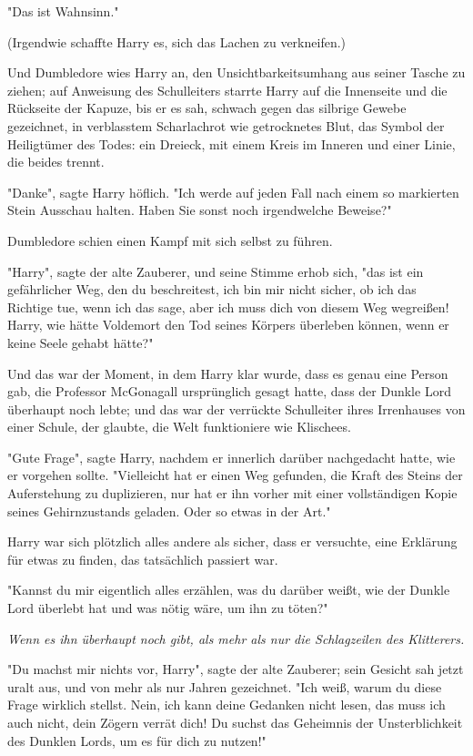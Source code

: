 {"Das ist Wahnsinn."

(Irgendwie schaffte Harry es, sich das Lachen zu verkneifen.)

Und Dumbledore wies Harry an, den Unsichtbarkeitsumhang aus seiner Tasche zu ziehen; auf Anweisung des Schulleiters starrte Harry auf die Innenseite und die Rückseite der Kapuze, bis er es sah, schwach gegen das silbrige Gewebe gezeichnet, in verblasstem Scharlachrot wie getrocknetes Blut, das Symbol der Heiligtümer des Todes: ein Dreieck, mit einem Kreis im Inneren und einer Linie, die beides trennt.

"Danke", sagte Harry höflich. "Ich werde auf jeden Fall nach einem so markierten Stein Ausschau halten. Haben Sie sonst noch irgendwelche Beweise?"

Dumbledore schien einen Kampf mit sich selbst zu führen.

"Harry", sagte der alte Zauberer, und seine Stimme erhob sich, "das ist ein gefährlicher Weg, den du beschreitest, ich bin mir nicht sicher, ob ich das Richtige tue, wenn ich das sage, aber ich muss dich von diesem Weg wegreißen! Harry, wie hätte Voldemort den Tod seines Körpers überleben können, wenn er keine Seele gehabt hätte?"

Und das war der Moment, in dem Harry klar wurde, dass es genau eine Person gab, die Professor McGonagall ursprünglich gesagt hatte, dass der Dunkle Lord überhaupt noch lebte; und das war der verrückte Schulleiter ihres Irrenhauses von einer Schule, der glaubte, die Welt funktioniere wie Klischees.

"Gute Frage", sagte Harry, nachdem er innerlich darüber nachgedacht hatte, wie er vorgehen sollte. "Vielleicht hat er einen Weg gefunden, die Kraft des Steins der Auferstehung zu duplizieren, nur hat er ihn vorher mit einer vollständigen Kopie seines Gehirnzustands geladen. Oder so etwas in der Art."

Harry war sich plötzlich alles andere als sicher, dass er versuchte, eine Erklärung für etwas zu finden, das tatsächlich passiert war.

"Kannst du mir eigentlich alles erzählen, was du darüber weißt, wie der Dunkle Lord überlebt hat und was nötig wäre, um ihn zu töten?"

\emph{Wenn es ihn überhaupt noch gibt, als mehr als nur die Schlagzeilen des Klitterers.}

"Du machst mir nichts vor, Harry", sagte der alte Zauberer; sein Gesicht sah jetzt uralt aus, und von mehr als nur Jahren gezeichnet. "Ich weiß, warum du diese Frage wirklich stellst. Nein, ich kann deine Gedanken nicht lesen, das muss ich auch nicht, dein Zögern verrät dich! Du suchst das Geheimnis der Unsterblichkeit des Dunklen Lords, um es für dich zu nutzen!"

}
